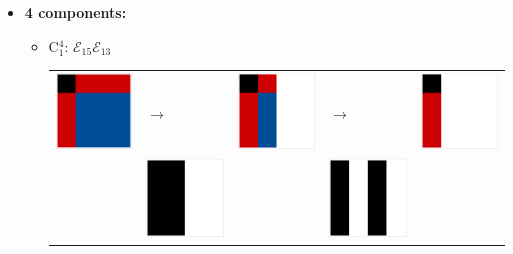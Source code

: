 \documentclass[11pt,dvipsnames]{article} %
\newcommand{\E}{\mathcal{E}}
\newcommand{\1}{\mathds{1}}
\begin{document}
\begin{itemize}
\item \textbf{4 components:} \newline
\begin{itemize}
\item C$_1^4$: $\E_{15}\E_{13}$\newline
\begin{tabular}{m{2cm} m{2cm} m{2cm} m{2cm} m{2cm}}
\includegraphics[width=2.2cm]{img-JA/id}  
& \hspace{0.8cm}$\longrightarrow$ 
& \includegraphics[width=2.2cm]{C81} 
& \hspace{0.8cm}$\longrightarrow$ 
& \includegraphics[width=2.2cm]{C41}\\ 
 & \includegraphics[width=2.2cm]{ruleC81} &  
 & \includegraphics[width=2.2cm]{ruleC81_2} &\\ 
\end{tabular} 


\end{itemize}
\end{itemize}
\end{document}
